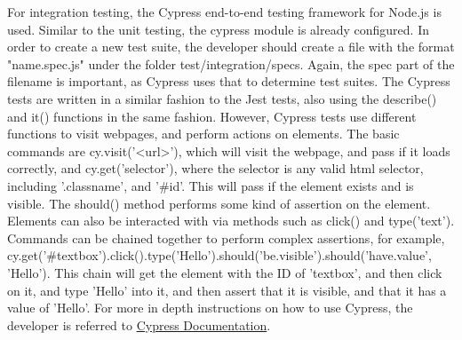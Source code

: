 \documentclass{article}
\begin{document}
For integration testing, the Cypress end-to-end testing framework for Node.js is used.
Similar to the unit testing, the cypress module is already configured. In order to
create a new test suite, the developer should create a file with the format "name.spec.js"
under the folder test/integration/specs. Again, the spec part of the filename is important,
as Cypress uses that to determine test suites. The Cypress tests are written in a similar fashion
to the Jest tests, also using the describe() and it() functions in the same fashion. However,
Cypress tests use different functions to visit webpages, and perform actions on elements.
The basic commands are cy.visit('<url>'), which will visit the webpage, and pass if it
loads correctly, and cy.get('selector'), where the selector is any valid html selector,
including '.classname', and '\#id'. This will pass if the element exists and is visible.
The should() method performs some kind of assertion on the element. Elements can also be interacted
with via methods such as click() and type('text').
Commands can be chained together to perform complex assertions, for example,
cy.get('\#textbox').click().type('Hello').should('be.visible').should('have.value', 'Hello').
This chain will get the element with the ID of 'textbox', and then click on it, and type
'Hello' into it, and then assert that it is visible, and that it has a value of 'Hello'.
For more in depth instructions on how to use Cypress, the developer is referred to 
\href{https://docs.cypress.io/api/introduction/api.html#Sections}{Cypress Documentation}.
\end{document}
